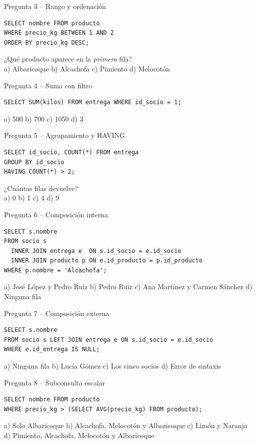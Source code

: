 \documentclass[11pt,a4paper]{article}
\begin{document}
\begin{reto}{Pregunta 3 -- Rango y ordenación}
\begin{lstlisting}
SELECT nombre FROM producto
WHERE precio_kg BETWEEN 1 AND 2
ORDER BY precio_kg DESC;
\end{lstlisting}
¿Qué producto aparece en la \emph{primera} fila?\\
a) Albaricoque \quad b) Alcachofa \ok \quad c) Pimiento \quad d) Melocotón
\end{reto}

\begin{reto}{Pregunta 4 -- Suma con filtro}
\begin{lstlisting}
SELECT SUM(kilos) FROM entrega WHERE id_socio = 1;
\end{lstlisting}
a) 500 \quad b) 700 \quad c) 1050 \ok \quad d) 3
\end{reto}

\begin{reto}{Pregunta 5 -- Agrupamiento y HAVING}
\begin{lstlisting}
SELECT id_socio, COUNT(*) FROM entrega
GROUP BY id_socio
HAVING COUNT(*) > 2;
\end{lstlisting}
¿Cuántas filas devuelve?\\
a) 0 \quad b) 1 \ok \quad c) 4 \quad d) 9
\end{reto}

\begin{reto}{Pregunta 6 -- Composición interna}
\begin{lstlisting}
SELECT s.nombre
FROM socio s
  INNER JOIN entrega e  ON s.id_socio = e.id_socio
  INNER JOIN producto p ON e.id_producto = p.id_producto
WHERE p.nombre = 'Alcachofa';
\end{lstlisting}
a) José López y Pedro Ruiz \ok \quad
b) Pedro Ruiz \quad
c) Ana Martínez y Carmen Sánchez \quad
d) Ninguna fila
\end{reto}

\begin{reto}{Pregunta 7 -- Composición externa}
\begin{lstlisting}
SELECT s.nombre
FROM socio s LEFT JOIN entrega e ON s.id_socio = e.id_socio
WHERE e.id_entrega IS NULL;
\end{lstlisting}
a) Ninguna fila \quad b) Lucía Gómez \ok \quad c) Los cinco socios \quad d) Error de sintaxis
\end{reto}

\begin{reto}{Pregunta 8 -- Subconsulta escalar}
\begin{lstlisting}
SELECT nombre FROM producto
WHERE precio_kg > (SELECT AVG(precio_kg) FROM producto);
\end{lstlisting}
a) Solo Albaricoque \quad
b) Alcachofa, Melocotón y Albaricoque \ok \quad
c) Limón y Naranja \quad
d) Pimiento, Alcachofa, Melocotón y Albaricoque
\end{reto}
\end{document}
